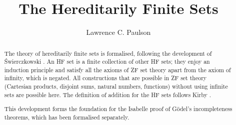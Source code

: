 \documentclass[11pt,a4paper]{report}
\begin{document}
\title{The Hereditarily Finite Sets}
\author{Lawrence C. Paulson}
\maketitle

\begin{abstract}
The theory of hereditarily finite sets is formalised, following 
the development of {\'S}wierczkowski \cite{swierczkowski-finite}.
An HF set is a finite collection of other HF sets; they enjoy an induction principle
and satisfy all the axioms of ZF set theory apart from the axiom of infinity, which is negated.
All constructions that are possible in ZF set theory (Cartesian products, disjoint sums, natural numbers,
functions) without using infinite sets are possible here.
The definition of addition for the HF sets follows Kirby \cite{kirby-addition}.

This development forms the foundation for the Isabelle proof of G\"odel's incompleteness theorems,
which has been formalised separately. 
\end{abstract}

\tableofcontents





\end{document}
